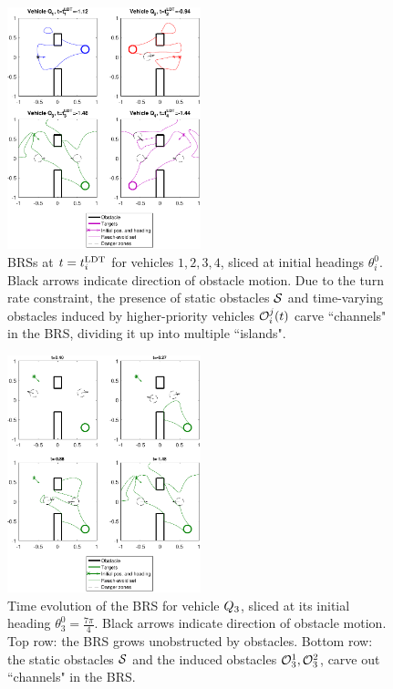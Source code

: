 \begin{figure}
	\centering
	\includegraphics[width=0.5\textwidth]{"fig/dubins_reach_all"}
	\caption{BRSs at $t=t^\text{LDT}_i$ for vehicles $1,2,3,4$, sliced at initial headings $\theta_i^0$. Black arrows indicate direction of obstacle motion. Due to the turn rate constraint, the presence of static obstacles $\mathcal{S}$ and time-varying obstacles induced by higher-priority vehicles $\mathcal{O}_i^j(t)$ carve ``channels" in the BRS, dividing it up into multiple ``islands".}
	\label{fig:dubins_reach_all}
\end{figure}

\begin{figure}
	\centering
	\includegraphics[width=0.5\textwidth]{"fig/dubins_reach_3"}
	\caption{Time evolution of the BRS for vehicle $Q_3$, sliced at its initial heading $\theta_3^0=\frac{7\pi}{4}$. Black arrows indicate direction of obstacle motion. Top row: the BRS grows unobstructed by obstacles. Bottom row: the static obstacles $\mathcal{S}$ and the induced obstacles $\mathcal{O}_3^1,\mathcal{O}_3^2$, carve out ``channels" in the BRS.}
	\label{fig:dubins_reach_3}
\end{figure}

